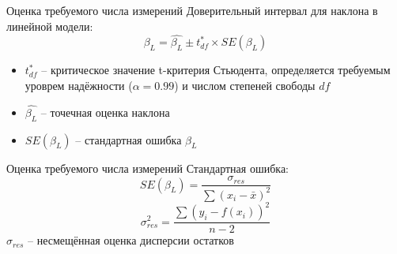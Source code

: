 \documentclass[14pt]{beamer}
\begin{document}
\begin{frame}{Оценка требуемого числа измерений}
  Доверительный интервал для наклона в линейной модели: \\
  \begin{equation}
  \beta_L = \hat{\beta_L} \pm t^{*}_{df} \times SE(\beta_L)
  \end{equation}
  \begin{itemize}
   \item $t^{*}_{df}$ -- критическое значение t-критерия Стьюдента, определяется
         требуемым уроврем надёжности ($\alpha = 0.99$) и числом степеней свободы $df$\\
   \item $\hat{\beta_L}$ -- точечная оценка наклона\\
   \item $SE(\beta_L)$ -- стандартная ошибка $\beta_L$
  \end{itemize}
\end{frame}

\begin{frame}{Оценка требуемого числа измерений}
  Стандартная ошибка: \\
  \begin{equation}
  SE(\beta_L) = \frac{ \sigma_{res} }{ \sum (x_i - \bar{x})^2 }
  \end{equation}
  \begin{equation}
  \sigma_{res}^2 = \frac{ \sum (y_i - f(x_i))^2 }{ n - 2 }
  \end{equation}
  $\sigma_{res}$ -- несмещённая оценка дисперсии остатков
\end{frame}

\itmothankyou
\end{document}

